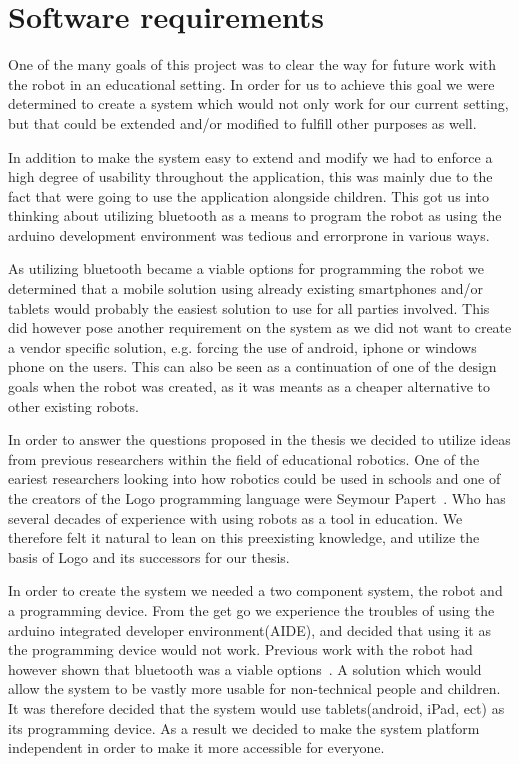 \section{Software requirements}
One of the many goals of this project was to clear the way for future work with the \chirp robot in an educational setting. In order for us to achieve this goal we were determined to create a system which would not only work for our current setting, but that could be extended and/or modified to fulfill other purposes as well.

\bigskip\noindent
In addition to make the system easy to extend and modify we had to enforce a high degree of usability throughout the application, this was mainly due to the fact that were going to use the application alongside children. This got us into thinking about utilizing bluetooth as a means to program the robot as using the arduino development environment was tedious and errorprone in various ways. 


\bigskip\noindent
As utilizing bluetooth became a viable options for programming the robot we determined that a mobile solution using already existing smartphones and/or tablets would probably the easiest solution to use for all parties involved. This did however pose another requirement on the system as we did not want to create a vendor specific solution, e.g. forcing the use of android, iphone or windows phone on the users. 
This can also be seen as a continuation of one of the design goals when the \chirp robot was created, as it was meants as a cheaper alternative to other existing robots. 


In order to answer the questions proposed in the thesis we decided to utilize ideas from previous researchers within the field of educational robotics. 
One of the eariest researchers looking into how robotics could be used in schools and one of the creators of the Logo programming language were Seymour Papert~\cite{papert1980mindstorms}. Who has several decades of experience with using robots as a tool in education.
We therefore felt it natural to lean on this preexisting knowledge, and utilize the basis of Logo and its successors for our thesis. 

\bigskip\noindent


\bigskip\noindent
In order to create the system we needed a two component system, the \chirp robot and a programming device. 
From the get go we experience the troubles of using the arduino integrated developer environment(AIDE), and decided that using it as the programming device would not work.
Previous work with the robot had however shown that bluetooth was a viable options~\cite{chrip2013ResearcherNight}.
A solution which would allow the system to be vastly more usable for non-technical people and children. 
It was therefore decided that the system would use tablets(android, iPad, ect) as its programming device.
As a result we decided to make the system platform independent in order to make it more accessible for everyone. 

